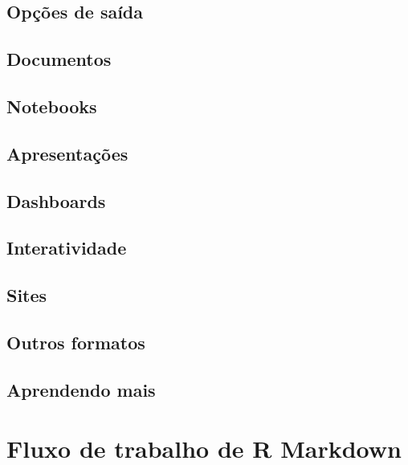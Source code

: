 \documentclass[
]{latex/krantz}
\theoremstyle{definition}
\theoremstyle{definition}
\theoremstyle{definition}
\theoremstyle{definition}
\theoremstyle{remark}
\begin{document}
\hypertarget{opuxe7uxf5es-de-sauxedda}{%
\section{Opções de saída}\label{opuxe7uxf5es-de-sauxedda}}

\hypertarget{documentos}{%
\section{Documentos}\label{documentos}}

\hypertarget{notebooks}{%
\section{Notebooks}\label{notebooks}}

\hypertarget{apresentauxe7uxf5es}{%
\section{Apresentações}\label{apresentauxe7uxf5es}}

\hypertarget{dashboards}{%
\section{Dashboards}\label{dashboards}}

\hypertarget{interatividade}{%
\section{Interatividade}\label{interatividade}}

\hypertarget{sites}{%
\section{Sites}\label{sites}}

\hypertarget{outros-formatos}{%
\section{Outros formatos}\label{outros-formatos}}

\hypertarget{aprendendo-mais-3}{%
\section{Aprendendo mais}\label{aprendendo-mais-3}}

\hypertarget{fluxo-de-trabalho-de-r-markdown}{%
\chapter{Fluxo de trabalho de R Markdown}\label{fluxo-de-trabalho-de-r-markdown}}
\end{document}
